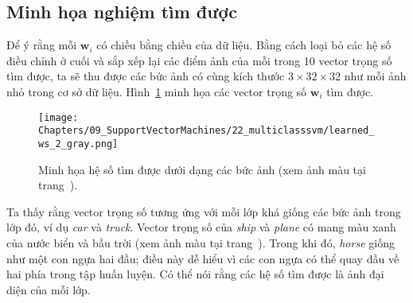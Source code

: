 





\subsection{Minh họa nghiệm tìm được}

Để ý rằng mỗi $\mathbf{w}_i$ có chiều bằng chiều của dữ liệu. Bằng cách loại bỏ các hệ số điều chỉnh ở cuối và sắp xếp lại các điểm ảnh của mỗi trong
10 vector trọng số tìm được, ta sẽ thu được các {bức ảnh} có cùng kích
thước $3\times 32\times32$ như mỗi ảnh nhỏ trong cơ sở dữ liệu.
Hình~\ref{fig:22_9} minh họa các vector trọng số $\mathbf{w}_i$ tìm được.
\begin{figure}[t]
\centering
\texttt{[image: Chapters/09\_SupportVectorMachines/22\_multiclasssvm/learned\_ws\_2\_gray.png]}
\caption[]{ Minh họa hệ số tìm được dưới dạng các bức ảnh (xem ảnh màu tại trang~\pageref{fig:22_9_c}).}
\label{fig:22_9}
\end{figure}

Ta thấy rằng vector trọng số tương ứng với mỗi lớp khá giống các bức
ảnh trong lớp đó, ví dụ \textit{car} và \textit{truck}. Vector trọng số của
\textit{ship} và \textit{plane} có mang màu xanh của nước biển và bầu trời (xem
ảnh màu tại trang~\pageref{fig:22_9_c}). Trong khi đó, \textit{horse} giống như
một con ngựa hai đầu; điều này dễ hiểu vì các con ngựa có
thể quay đầu về hai phía trong tập huấn luyện. Có thể nói rằng các hệ số tìm được là ảnh đại diện của mỗi lớp.

